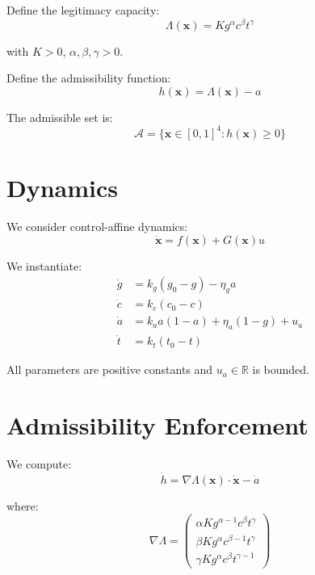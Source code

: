 \documentclass[letterpaper, 10 pt, conference]{ieeeconf}
\begin{document}
Define the legitimacy capacity:
\begin{equation}
\Lambda(\mathbf{x}) = K g^\alpha c^\beta t^\gamma
\end{equation}

with $K>0$, $\alpha,\beta,\gamma>0$.

Define the admissibility function:
\begin{equation}
h(\mathbf{x}) = \Lambda(\mathbf{x}) - a
\end{equation}

The admissible set is:
\begin{equation}
\mathcal{A} = \{ \mathbf{x} \in [0,1]^4 : h(\mathbf{x}) \ge 0 \}
\end{equation}

\section{Dynamics}

We consider control-affine dynamics:
\begin{equation}
\dot{\mathbf{x}} = f(\mathbf{x}) + G(\mathbf{x}) u
\end{equation}

We instantiate:
\begin{align}
\dot{g} &= k_g (g_0 - g) - \eta_g a \\
\dot{c} &= k_c (c_0 - c) \\
\dot{a} &= k_a a (1-a) + \eta_a (1-g) + u_a \\
\dot{t} &= k_t (t_0 - t)
\end{align}

All parameters are positive constants and $u_a \in \mathbb{R}$ is bounded.

\section{Admissibility Enforcement}

We compute:
\begin{equation}
\dot{h} = \nabla \Lambda(\mathbf{x}) \cdot \dot{\mathbf{x}} - \dot{a}
\end{equation}

where:
\begin{equation}
\nabla \Lambda =
\begin{pmatrix}
\alpha K g^{\alpha-1} c^\beta t^\gamma \\
\beta K g^\alpha c^{\beta-1} t^\gamma \\
\gamma K g^\alpha c^\beta t^{\gamma-1}
\end{pmatrix}
\end{equation}
\end{document}
